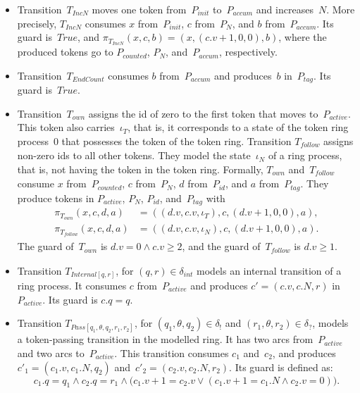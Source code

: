 \documentclass[11pt]{article}
\theoremstyle{definition}
\begin{document}
\begin{itemize}
  \item Transition~$T_{\mathit{IncN}}$ moves one token from~$P_{\mathit{init}}$
    to~$P_{\mathit{accum}}$ and increases~$N$. More precisely,
    $T_{\mathit{IncN}}$ consumes $x$ from~$P_{\mathit{init}}$, $c$ from~$P_N$,
    and $b$ from~$P_{\mathit{accum}}$. Its guard is~$\mathit{True}$, and
    $\pi_{T_{\mathit{IncN}}}(x, c, b) = (x, (c.v + 1, 0, 0), b)$, where the
    produced tokens go to $P_{\mathit{counted}}$, $P_N$,
    and~$P_{\mathit{accum}}$, respectively.

  \item Transition~$T_{\mathit{EndCount}}$ consumes $b$
    from~$P_{\mathit{accum}}$ and produces~$b$ in~$P_{\mathit{tag}}$. Its guard
    is~$\mathit{True}$.

  \item Transition~$T_{\mathit{own}}$ assigns the id of zero to the first token
    that moves to~$P_{\mathit{active}}$. This token also carries~$\iota_T$,
    that is, it corresponds to a state of the token ring process~0 that
    possesses the token of the token ring. Transition $T_{\mathit{follow}}$
    assigns non-zero ids to all other tokens. They model the state~$\iota_N$ of
    a ring process, that is, not having the token in the token ring.
    Formally,
    $T_{\mathit{own}}$ and~$T_{\mathit{follow}}$ consume $x$ from~$P_{\mathit{counted}}$,
    $c$ from~$P_N$, $d$ from~$P_{\mathit{id}}$, and $a$
    from~$P_{\mathit{tag}}$. They produce tokens in $P_{\mathit{active}}$,
    $P_N$, $P_{\mathit{id}}$, and~$P_{\mathit{tag}}$ with
    \begin{align*}
      \pi_{T_{\mathit{own}}}(x, c, d, a)
        &= ((d.v, c.v, \iota_T), c, (d.v + 1, 0, 0), a),\\
      \pi_{T_{\mathit{follow}}}(x, c, d, a)
        &= ((d.v, c.v, \iota_N), c, (d.v + 1, 0, 0), a).
    \end{align*}
    The guard of~$T_{\mathit{own}}$ is $d.v = 0 \wedge c.v \ge 2$, and the
    guard of~$T_{\mathit{follow}}$ is $d.v \ge 1$.

  \item Transition $T_{\mathit{Internal}[q, r]}$, for $(q, r) \in
    \delta_{\mathit{int}}$ models an internal transition of a ring process. It
    consumes $c$ from~$P_{\mathit{active}}$ and produces $c' = (c.v, c.N, r)$
    in~$P_{\mathit{active}}$. Its guard is $c.q = q$.

  \item Transition $T_{\mathit{Pass}[q_1, \theta, q_2, r_1, r_2]}$, for
    $(q_1, \theta, q_2) \in \delta_!$ and $(r_1, \theta, r_2) \in \delta_?$,
    models a token-passing transition in the modelled ring.
    It has two arcs from~$P_{\mathit{active}}$ and two arcs
    to~$P_{\mathit{active}}$. This transition consumes $c_1$ and~$c_2$, and produces
    $c'_1 = (c_1.v, c_1.N, q_2)$ and~$c'_2 = (c_2.v, c_2.N, r_2)$. Its guard
    is defined as:
    \begin{equation*}
      c_1.q = q_1 \wedge c_2.q = r_1 \wedge
      \bigl(c_1.v + 1 = c_2.v \vee (c_1.v + 1 = c_1.N \wedge c_2.v = 0)\bigr).
    \end{equation*}


\end{itemize}
\end{document}
